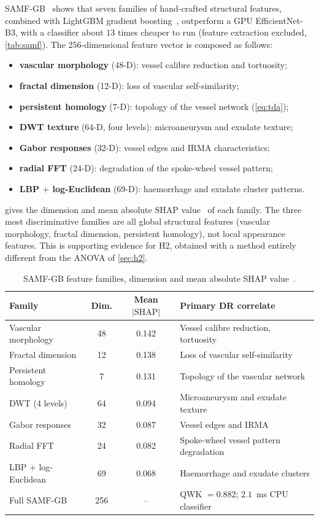 SAMF-GB~\cite{belhadj2026samfgb} shows that seven families of hand-crafted structural
features, combined with LightGBM gradient boosting~\cite{ke2017lightgbm}, outperform a
GPU EfficientNet-B3, with a classifier about $13$ times cheaper to run (feature extraction
excluded, \cref{tab:samf}). The 256-dimensional
feature vector is composed as follows:
\begin{itemize}
\item \textbf{vascular morphology} (48-D): vessel calibre reduction and tortuosity;
\item \textbf{fractal dimension} (12-D): loss of vascular self-similarity;
\item \textbf{persistent homology} (7-D): topology of the vessel network (\cref{eq:tda});
\item \textbf{DWT texture} (64-D, four levels): microaneurysm and exudate texture;
\item \textbf{Gabor responses} (32-D): vessel edges and IRMA characteristics;
\item \textbf{radial FFT} (24-D): degradation of the spoke-wheel vessel pattern;
\item \textbf{LBP $+$ log-Euclidean} (69-D): haemorrhage and exudate cluster patterns.
\end{itemize}

 gives the dimension and mean absolute SHAP value~\cite{lundberg2017shap}
of each family. The three most discriminative families are all global structural
features (vascular morphology, fractal dimension, persistent homology), not local
appearance features. This is supporting evidence for H2, obtained with a method entirely
different from the ANOVA of \cref{sec:h2}.

\begin{table}[!htbp]
\centering
\caption[SAMF-GB feature families and mean absolute SHAP values]{SAMF-GB feature families, dimension and mean absolute SHAP
value~\cite{belhadj2026samfgb}.}
\label{tab:shap}
\small
\begin{tabular}{@{}lccP{6.2cm}@{}}
\toprule
Family & Dim. & Mean $|\mathrm{SHAP}|$ & Primary DR correlate \\
\midrule
Vascular morphology & 48 & 0.142 & Vessel calibre reduction, tortuosity \\
Fractal dimension & 12 & 0.138 & Loss of vascular self-similarity \\
Persistent homology & 7 & 0.131 & Topology of the vascular network \\
DWT (4 levels) & 64 & 0.094 & Microaneurysm and exudate texture \\
Gabor responses & 32 & 0.087 & Vessel edges and IRMA \\
Radial FFT & 24 & 0.082 & Spoke-wheel vessel pattern degradation \\
LBP $+$ log-Euclidean & 69 & 0.068 & Haemorrhage and exudate clusters \\
\midrule
Full SAMF-GB & 256 & -- & QWK $=0.882$; $2.1$~ms CPU classifier \\
\bottomrule
\end{tabular}
\end{table}

